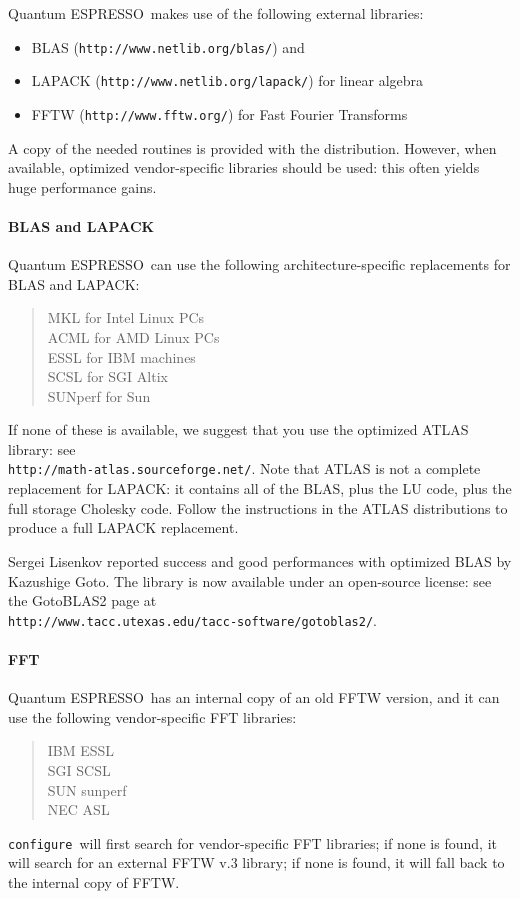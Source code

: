 \documentclass[12pt,a4paper]{article}
\def\qe{{\sc Quantum ESPRESSO}}
\def\configure{\texttt{configure}}
\begin{document}
\qe\ makes use of the following external libraries:
\begin{itemize}
\item BLAS (\texttt{http://www.netlib.org/blas/}) and 
\item LAPACK (\texttt{http://www.netlib.org/lapack/}) for linear algebra 
\item FFTW (\texttt{http://www.fftw.org/}) for Fast Fourier Transforms
\end{itemize}
A copy of the needed routines is provided with the distribution. However,
when available, optimized vendor-specific libraries should be used: this
often yields huge performance gains.

\paragraph{BLAS and LAPACK} 
\qe\ can use the following architecture-specific replacements for BLAS and LAPACK:\\
\begin{quote}
MKL for Intel Linux PCs\\
ACML for AMD Linux PCs\\
ESSL for IBM machines\\
SCSL for SGI Altix\\
SUNperf for Sun
\end{quote}
If none of these is available, we suggest that you use the optimized ATLAS library: see \\
\texttt{http://math-atlas.sourceforge.net/}. Note that ATLAS is not
a complete replacement for LAPACK: it contains all of the BLAS, plus the
LU code, plus the full storage Cholesky code. Follow the instructions in the
ATLAS distributions to produce a full LAPACK replacement.
    
Sergei Lisenkov reported success and good performances with optimized
BLAS by Kazushige Goto. The library is now available under an 
open-source license: see the GotoBLAS2 page at \\
\texttt{http://www.tacc.utexas.edu/tacc-software/gotoblas2/}.

\paragraph{FFT}
\qe\ has an internal copy of an old FFTW version, and it 
can use the following vendor-specific FFT libraries:
\begin{quote}
      IBM ESSL\\
      SGI SCSL\\
      SUN sunperf\\
      NEC ASL
\end{quote}
\configure\ will first search for vendor-specific FFT libraries;
if none is found, it will search for an external FFTW v.3 library;
if none is found, it will fall back to the internal  copy of FFTW.
\end{document}
